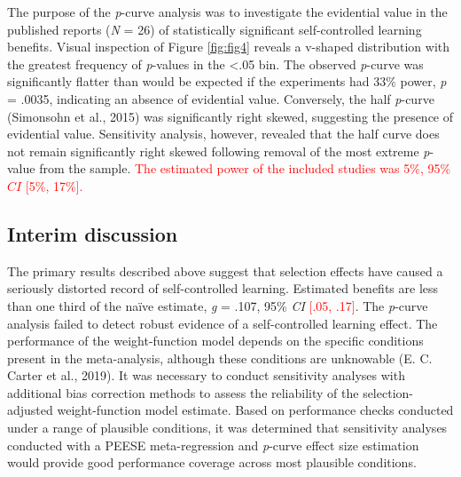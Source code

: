 \documentclass[
  english,
  man,floatsintext]{apa7}
\begin{document}
The purpose of the \emph{p}-curve analysis was to investigate the evidential value in the published reports (\emph{N} = 26) of statistically significant self-controlled learning benefits. Visual inspection of Figure \ref{fig:fig4} reveals a v-shaped distribution with the greatest frequency of \emph{p}-values in the \textless.05 bin. The observed \emph{p}-curve was significantly flatter than would be expected if the experiments had 33\% power, \emph{p} = .0035, indicating an absence of evidential value. Conversely, the half \emph{p}-curve (Simonsohn et al., 2015) was significantly right skewed, suggesting the presence of evidential value. Sensitivity analysis, however, revealed that the half curve does not remain significantly right skewed following removal of the most extreme \emph{p}-value from the sample. \textcolor{red}{The estimated power of the included studies was 5\%, 95\% $CI$ [5\%, 17\%].}

\hypertarget{interim-discussion}{%
\subsection{Interim discussion}\label{interim-discussion}}

The primary results described above suggest that selection effects have caused a seriously distorted record of self-controlled learning. Estimated benefits are less than one third of the naïve estimate, \emph{g} = .107, 95\% \emph{CI} \textcolor{red}{[.05, .17]}. The \emph{p}-curve analysis failed to detect robust evidence of a self-controlled learning effect. The performance of the weight-function model depends on the specific conditions present in the meta-analysis, although these conditions are unknowable (E. C. Carter et al., 2019). It was necessary to conduct sensitivity analyses with additional bias correction methods to assess the reliability of the selection-adjusted weight-function model estimate. Based on performance checks conducted under a range of plausible conditions, it was determined that sensitivity analyses conducted with a PEESE meta-regression and \emph{p}-curve effect size estimation would provide good performance coverage across most plausible conditions.
\end{document}
